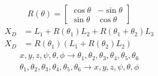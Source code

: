 \documentclass{article}
\begin{document}
\begin{align*}
  R(\theta) = \left[\begin{matrix}
  \cos{\theta}&-\sin{\theta}\\
  \sin{\theta}&\cos{\theta}
  \end{matrix}\right]
\end{align*}
\begin{align*}
    X_D & =L_1 + R\left(\theta_1\right)L_2+R\left(\theta_1 + \theta_2\right)L_3\\
    X_D & =R\left(\theta_1\right)\left(L_1 + R\left(\theta_2\right)L_2\right)
\end{align*}
\begin{align*}
  x, y, z, \psi, \theta, \phi \longrightarrow \theta_1, \theta_2, \theta_3, \theta_4, \theta_5, \theta_6\\
  \theta_1, \theta_2, \theta_3, \theta_4, \theta_5, \theta_6 \longrightarrow x, y, z, \psi, \theta, \phi \\
\end{align*}
\end{document}
